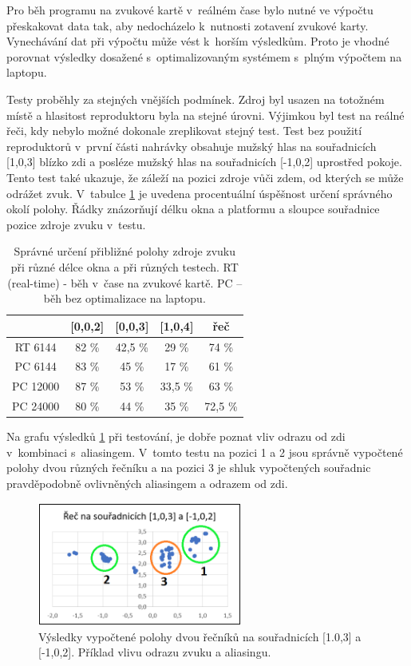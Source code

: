 Pro běh programu na zvukové kartě v~reálném čase bylo nutné ve výpočtu přeskakovat data tak, aby nedocházelo k~nutnosti zotavení zvukové karty. Vynechávání dat při výpočtu může vést k~horším výsledkům. Proto je vhodné porovnat výsledky dosažené s~optimalizovaným systémem s~plným výpočtem na laptopu.

Testy proběhly za stejných vnějších podmínek. Zdroj byl usazen na totožném místě a hlasitost reproduktoru byla na stejné úrovni. Výjimkou byl test na reálné řeči, kdy nebylo možné dokonale zreplikovat stejný test. Test bez použití reproduktorů v~první části nahrávky obsahuje mužský hlas na souřadnicích [1,0,3] blízko zdi a posléze mužský hlas na souřadnicích [-1,0,2] uprostřed pokoje. Tento test také ukazuje, že záleží na pozici zdroje vůči zdem, od kterých se může odrážet zvuk. V~tabulce \ref{tabulka4} je uvedena procentuální úspěšnost určení správného okolí polohy. Řádky znázorňují délku okna a platformu a sloupce souřadnice pozice zdroje zvuku v~testu.

\begin{table}[!h]
    \centering
    \begin{tabular}{|| c |c | c | c | c||} 
 \hline
 & [0,0,2] & [0,0,3] & [1,0,4] & řeč \\ [0.5ex] 
 \hline
 RT 6144 & 82 \% & 42,5 \% & 29 \% & 74 \% \\ 
 \hline
 PC 6144 & 83 \% & 45 \% & 17 \% & 61 \% \\
 \hline
 PC 12000 & 87 \% & 53 \% & 33,5 \% & 63 \% \\
 \hline
 PC 24000 & 80 \% & 44 \% & 35 \% & 72,5 \% \\ [1ex] 
 \hline
    \end{tabular}
    \caption{Správné určení přibližné polohy zdroje zvuku při různé délce okna a při různých testech. RT (real-time) - běh v~čase na zvukové kartě. PC – běh bez optimalizace na laptopu.}
    \label{tabulka4}
\end{table}

Na grafu výsledků \ref{pic:rec_chyba} při testování, je dobře poznat vliv odrazu od zdi v~kombinaci s~aliasingem. V~tomto testu na pozici 1 a 2 jsou správně vypočtené polohy dvou různých řečníku a na pozici 3 je shluk vypočtených souřadnic pravděpodobně ovlivněných aliasingem a odrazem od zdi.

\begin{figure}[hbt]
	\centering
	\includegraphics[width=0.6\textwidth]{obrazky-figures/rec_chyba.png}
	\caption{Výsledky vypočtené polohy dvou řečníků na souřadnicích [1.0,3] a [-1,0,2]. Příklad vlivu odrazu zvuku a aliasingu.}
	\label{pic:rec_chyba}
\end{figure}

